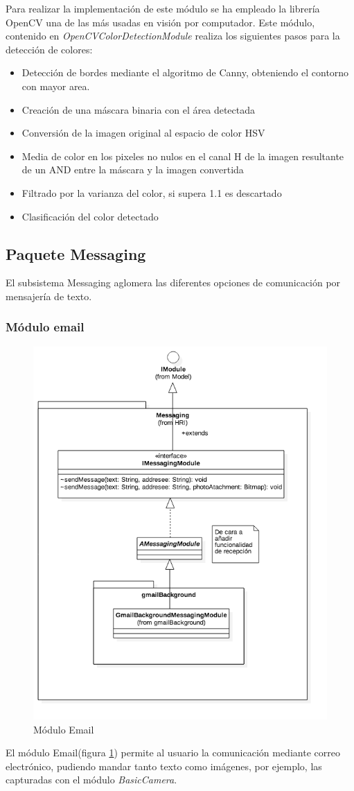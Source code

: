 Para realizar la implementación de este módulo se ha empleado la librería OpenCV\cite{opencv} una de las más usadas en visión por computador. Este módulo, contenido en \textit{OpenCVColorDetectionModule} realiza los siguientes pasos para la detección de colores:
\begin{itemize}
	\item Detección de bordes mediante el algoritmo de Canny, obteniendo el contorno con mayor area.
	\item Creación de una máscara binaria con el área detectada
	\item Conversión de la imagen original al espacio de color HSV
	\item Media de color en los pixeles no nulos en el canal H de la imagen resultante de un AND entre la máscara y la imagen convertida
	\item Filtrado por la varianza del color, si supera 1.1 es descartado
	\item Clasificación del color detectado
\end{itemize}

\subsection{Paquete Messaging}
El subsistema Messaging aglomera las diferentes opciones de comunicación por mensajería de texto.

\subsubsection{Módulo email}
\begin{figure}
	\centering
	\includegraphics[width=0.7\linewidth]{imagenes/diagramas/MessagingModule.png}
	\caption{Módulo Email}
	\label{fig:email-module}
\end{figure}
El módulo Email(figura \ref{fig:email-module}) permite al usuario la comunicación mediante correo electrónico, pudiendo mandar tanto texto como imágenes, por ejemplo, las capturadas con el módulo \textit{BasicCamera}.


